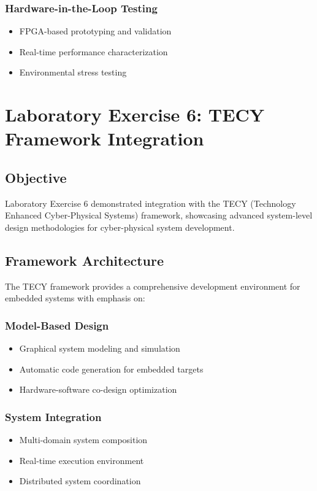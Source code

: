 \documentclass[11pt,a4paper]{article}
\begin{document}
\subsubsection{Hardware-in-the-Loop Testing}
\begin{itemize}[leftmargin=*]
    \item FPGA-based prototyping and validation
    \item Real-time performance characterization
    \item Environmental stress testing
\end{itemize}

\section{Laboratory Exercise 6: TECY Framework Integration}

\subsection{Objective}
Laboratory Exercise 6 demonstrated integration with the TECY (Technology Enhanced Cyber-Physical Systems) framework, showcasing advanced system-level design methodologies for cyber-physical system development.

\subsection{Framework Architecture}

The TECY framework provides a comprehensive development environment for embedded systems with emphasis on:

\subsubsection{Model-Based Design}
\begin{itemize}[leftmargin=*]
    \item Graphical system modeling and simulation
    \item Automatic code generation for embedded targets
    \item Hardware-software co-design optimization
\end{itemize}

\subsubsection{System Integration}
\begin{itemize}[leftmargin=*]
    \item Multi-domain system composition
    \item Real-time execution environment
    \item Distributed system coordination
\end{itemize}
\end{document}
